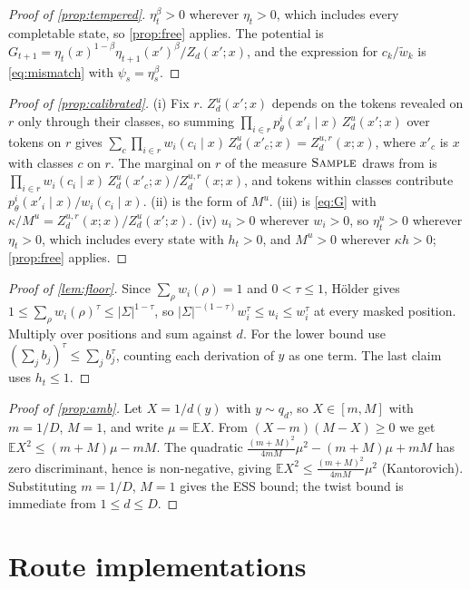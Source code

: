 \documentclass[11pt]{article}
\theoremstyle{definition}
\newcommand{\E}{\mathbb{E}}
\newcommand{\wt}{\tilde w}
\newcommand{\op}[1]{\textup{\textsc{#1}}}
\begin{document}
\begin{proof}[Proof of \cref{prop:tempered}]
$\eta_t^\beta>0$ wherever $\eta_t>0$, which includes every completable state, so \cref{prop:free} applies. The
potential is $G_{t+1}=\eta_t(x)^{1-\beta}\eta_{t+1}(x')^\beta/Z_d(x';x)$, and the expression for $c_k/\wt_k$ is
\eqref{eq:mismatch} with $\psi_s=\eta_s^\beta$.
\end{proof}

\begin{proof}[Proof of \cref{prop:calibrated}]
(i) Fix $r$. $Z^u_d(x';x)$ depends on the tokens revealed on $r$ only through their classes, so summing
$\prod_{i\in r}p^i_\theta(x'_i\mid x)\,Z^u_d(x';x)$ over tokens on $r$ gives
$\sum_c\prod_{i\in r}w_i(c_i\mid x)\,Z^u_d(x'_c;x)=Z^{u,r}_d(x;x)$, where $x'_c$ is $x$ with classes $c$ on $r$.
The marginal on $r$ of the measure $\op{Sample}$ draws from is
$\prod_{i\in r}w_i(c_i\mid x)\,Z^u_d(x'_c;x)/Z^{u,r}_d(x;x)$, and tokens within classes contribute
$p^i_\theta(x'_i\mid x)/w_i(c_i\mid x)$. (ii) is the form of $M^u$. (iii) is \eqref{eq:G} with
$\kappa/M^u=Z^{u,r}_d(x;x)/Z^u_d(x';x)$. (iv) $u_i>0$ wherever $w_i>0$, so $\eta^u_t>0$ wherever $\eta_t>0$,
which includes every state with $h_t>0$, and $M^u>0$ wherever $\kappa h>0$; \cref{prop:free} applies.
\end{proof}

\begin{proof}[Proof of \cref{lem:floor}]
Since $\sum_\rho w_i(\rho)=1$ and $0<\tau\le1$, Hölder gives $1\le\sum_\rho w_i(\rho)^\tau\le|\Sigma|^{1-\tau}$,
so $|\Sigma|^{-(1-\tau)}w_i^\tau\le u_i\le w_i^\tau$ at every masked position. Multiply over positions and sum
against $d$. For the lower bound use $(\sum_jb_j)^\tau\le\sum_jb_j^\tau$, counting each derivation of $y$ as one
term. The last claim uses $h_t\le1$.
\end{proof}

\begin{proof}[Proof of \cref{prop:amb}]
Let $X=1/d(y)$ with $y\sim q_d$, so $X\in[m,M]$ with $m=1/D$, $M=1$, and write $\mu=\E X$. From
$(X-m)(M-X)\ge0$ we get $\E X^2\le(m+M)\mu-mM$. The quadratic $\frac{(m+M)^2}{4mM}\mu^2-(m+M)\mu+mM$ has zero
discriminant, hence is non-negative, giving $\E X^2\le\frac{(m+M)^2}{4mM}\mu^2$ (Kantorovich). Substituting
$m=1/D$, $M=1$ gives the ESS bound; the twist bound is immediate from $1\le d\le D$.
\end{proof}

\section{Route implementations}\label{app:routes}
\end{document}
